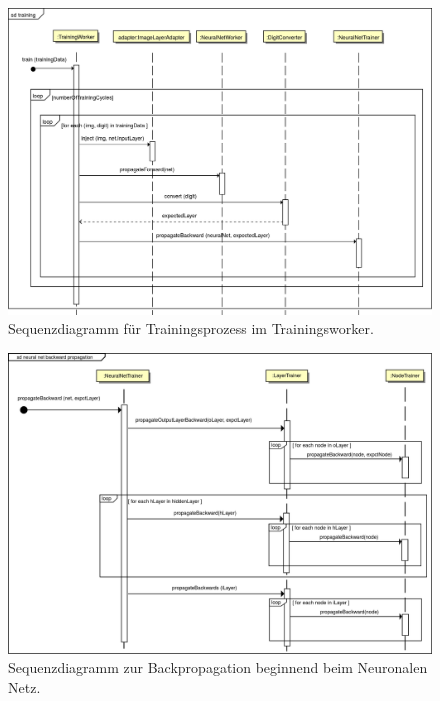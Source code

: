 \begin{figure}[H]
\begin{center}
\includegraphics[width=14.2cm]{Abbildungen/UML/jan/trainDetailed1.png}
\caption{Sequenzdiagramm für Trainingsprozess im Trainingsworker.}
\label{fig_sdTraining}
\end{center}
\end{figure}
\vspace{-0.5cm}
\begin{figure}[H]
\begin{center}
\includegraphics[width=15cm]{Abbildungen/UML/jan/gradientdescent1.png}
\caption{Sequenzdiagramm zur Backpropagation beginnend beim Neuronalen Netz.}
\label{fig_sdBackpropagation}
\end{center}
\end{figure}

